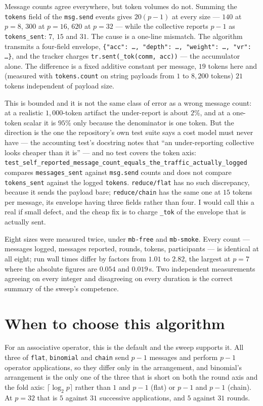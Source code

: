 \documentclass[11pt]{article}
\begin{document}
Message counts agree everywhere, but token volumes do not. Summing the \texttt{tokens} field of
the \texttt{msg.send} events gives $20(p-1)$ at every size --- $140$ at $p=8$, $300$ at $p=16$,
$620$ at $p=32$ --- while the collective reports $p-1$ as \texttt{tokens\_sent}: $7$, $15$ and
$31$. The cause is a one-line mismatch. The algorithm transmits a four-field envelope,
\texttt{\{"acc": \dots, "depth": \dots, "weight": \dots, "vr": \dots\}}, and the tracker charges
\texttt{tr.sent(\_tok(comm, acc))} --- the accumulator alone. The difference is a fixed additive
constant per message, $19$ tokens here and (measured with \texttt{tokens.count} on string
payloads from $1$ to $8{,}200$ tokens) $21$ tokens independent of payload size.

This is bounded and it is not the same class of error as a wrong message count: at a realistic
$1{,}000$-token artifact the under-report is about $2\%$, and at a one-token scalar it is
$95\%$ only because the denominator is one token. But the direction is the one the repository's
own test suite says a cost model must never have --- the accounting test's docstring notes that
``an under-reporting collective looks cheaper than it is'' --- and no test covers the token
axis: \texttt{test\_self\_reported\_message\_count\_equals\_the\_traffic\_actually\_logged}
compares \texttt{messages\_sent} against \texttt{msg.send} counts and does not compare
\texttt{tokens\_sent} against the logged \texttt{tokens}. \texttt{reduce/flat} has no such
discrepancy, because it sends the payload bare; \texttt{reduce/chain} has the same one at $15$
tokens per message, its envelope having three fields rather than four. I would call this a real
if small defect, and the cheap fix is to charge \texttt{\_tok} of the envelope that is actually
sent.

Eight sizes were measured twice, under \texttt{mb-free} and \texttt{mb-smoke}. Every count ---
messages logged, messages reported, rounds, tokens, participants --- is identical at all eight;
run wall times differ by factors from $1.01$ to $2.82$, the largest at $p=7$ where the absolute
figures are $0.054$ and $0.019$\,s. Two independent measurements agreeing on every integer and
disagreeing on every duration is the correct summary of the sweep's competence.

\section{When to choose this algorithm}

For an associative operator, this is the default and the sweep supports it. All three of
\texttt{flat}, \texttt{binomial} and \texttt{chain} send $p-1$ messages and perform $p-1$
operator applications, so they differ only in the arrangement, and binomial's arrangement is
the only one of the three that is short on both the round axis and the fold axis:
$\lceil\log_2 p\rceil$ rather than $1$ and $p-1$ (flat) or $p-1$ and $p-1$ (chain). At $p=32$
that is $5$ against $31$ successive applications, and $5$ against $31$ rounds.
\end{document}
